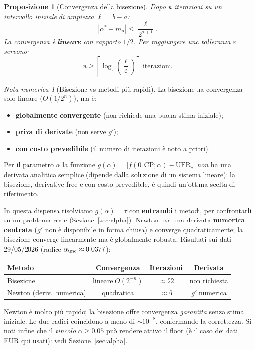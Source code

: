 \documentclass[11pt,a4paper]{article}
\theoremstyle{plain}
\newtheorem{proposizione}[teorema]{Proposizione}
\theoremstyle{definition}
\theoremstyle{remark}
\newtheorem*{attenzione}{Nota numerica}
\newcommand{\UFR}{\ensuremath{\mathrm{UFR}}}
\newcommand{\CP}{\ensuremath{\mathrm{CP}}}
\newcommand{\abs}[1]{\left\lvert #1 \right\rvert}
\begin{document}
\begin{proposizione}[Convergenza della bisezione]
\label{prop:bisez}
Dopo $n$ iterazioni su un intervallo iniziale di ampiezza $\ell = b-a$:
\begin{equation}
  \label{eq:bisez_err}
  \abs{\alpha^* - m_n} \le \frac{\ell}{2^{n+1}}.
\end{equation}
La convergenza \`e \textbf{lineare} con rapporto $1/2$. Per raggiungere una
tolleranza $\varepsilon$ servono:
\begin{equation}
  \label{eq:bisez_iter}
  n \ge \left\lceil \log_2\!\left(\frac{\ell}{\varepsilon}\right) \right\rceil
  \text{ iterazioni.}
\end{equation}
\end{proposizione}

\begin{attenzione}[Bisezione vs metodi pi\`u rapidi]
La bisezione ha convergenza solo lineare ($O(1/2^n)$), ma \`e:
\begin{itemize}
  \item \textbf{globalmente convergente} (non richiede una buona stima iniziale);
  \item \textbf{priva di derivate} (non serve $g'$);
  \item \textbf{con costo prevedibile} (il numero di iterazioni \`e noto a priori).
\end{itemize}
Per il parametro $\alpha$ la funzione $g(\alpha) = \abs{f(0,\CP;\alpha) - \UFR_c}$
\emph{non} ha una derivata analitica semplice (dipende dalla soluzione di un sistema
lineare): la bisezione, derivative-free e con costo prevedibile, è quindi un'ottima
scelta di riferimento.
\end{attenzione}

\begin{keybox}
In questa dispensa risolviamo $g(\alpha)=\tau$ con \textbf{entrambi} i metodi,
per confrontarli su un problema reale (Sezione~\ref{sec:alpha}). Newton usa una
derivata \textbf{numerica centrata} ($g'$ non è disponibile in forma chiusa) e
converge quadraticamente; la bisezione converge linearmente ma è globalmente
robusta. Risultati sui dati 29/05/2026 (radice $\alpha_{\rm unc}\approx 0.0377$):
\begin{center}\small
\renewcommand{\arraystretch}{1.2}
\begin{tabular}{lccc}
\toprule
\textbf{Metodo} & \textbf{Convergenza} & \textbf{Iterazioni} & \textbf{Derivata}\\
\midrule
Bisezione & lineare $O(2^{-n})$ & $\approx 22$ & non richiesta\\
Newton (deriv.\ numerica) & quadratica & $\approx 6$ & $g'$ numerica\\
\bottomrule
\end{tabular}
\end{center}
Newton è molto più rapido; la bisezione offre convergenza \emph{garantita} senza
stima iniziale. Le due radici coincidono a meno di $\sim 10^{-8}$, confermando la
correttezza. Si noti infine che il \emph{vincolo} $\alpha\ge 0.05$ può rendere
attivo il floor (è il caso dei dati EUR qui usati): vedi Sezione~\ref{sec:alpha}.
\end{keybox}
\end{document}
